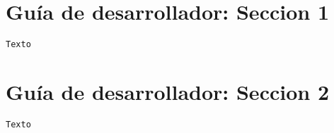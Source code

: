 \section{Gu\'ia de desarrollador: Seccion 1}
\label{Apendice3:label}

\begin{center}
\begin{footnotesize}

\begin{verbatim}
Texto
\end{verbatim}

\end{footnotesize}
\end{center}

\section{Gu\'ia de desarrollador: Seccion 2}
\label{Apendice3:label2}

\begin{center}
\begin{footnotesize}

\begin{verbatim}
Texto
\end{verbatim}


\end{footnotesize}
\end{center}
